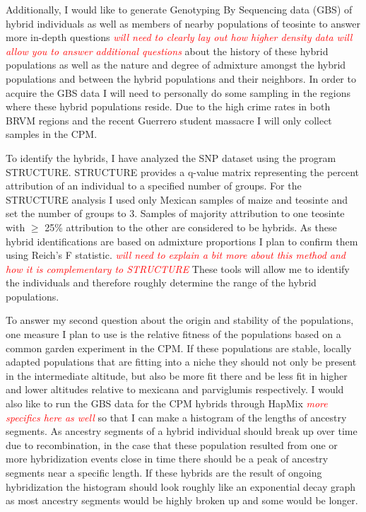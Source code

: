 \documentclass[12pt]{amsart}
\newcommand{\mbh}[1]{\textcolor{red}{ \emph{\scriptsize  #1}} }
\begin{document}
Additionally, I would like to generate Genotyping By Sequencing data (GBS) of hybrid individuals as well as members of nearby populations of teosinte to answer more in-depth questions \mbh{will need to clearly lay out how higher density data will allow you to answer additional questions} about the history of these hybrid populations as well as the nature and degree of admixture amongst the hybrid populations and between the hybrid populations and their neighbors.  
In order to acquire the GBS data I will need to personally do some sampling in the regions where these hybrid populations reside.  
Due to the high crime rates in both BRVM regions and the recent Guerrero student massacre I will only collect samples in the CPM.%

To identify the hybrids, I have analyzed the SNP dataset using the program STRUCTURE.  STRUCTURE provides a q-value matrix representing the percent attribution of an individual to a specified number of groups.  
For the STRUCTURE analysis I used only Mexican samples of maize and teosinte and set the number of groups to 3.
Samples of majority attribution to one teosinte with $\geq$ 25\% attribution to the other are considered to be hybrids.
As these hybrid identifications are based on admixture proportions I plan to confirm them using Reich's F statistic. \mbh{will need to explain a bit more about this method and how it is complementary to STRUCTURE}
These tools will allow me to identify the individuals and therefore roughly determine the range of the hybrid populations.

To answer my second question about the origin and stability of the populations, one measure I plan to use is the relative fitness of the populations based on a common garden experiment in the CPM. 
If these populations are stable, locally adapted populations that are fitting into a niche they should not only be present in the intermediate altitude, but also be more fit there and be less fit in higher and lower altitudes relative to mexicana and parviglumis respectively.
I would also like to run the GBS data for the CPM hybrids through HapMix \mbh{more specifics here as well} so that I can make a histogram of the lengths of ancestry segments.  
As ancestry segments of a hybrid individual should break up over time due to recombination, in the case that these population resulted from one or more hybridization events close in time there should be a peak of ancestry segments near a specific length.
If these hybrids are the result of ongoing hybridization the histogram should look roughly like an exponential decay graph as most ancestry segments would be highly broken up and some would be longer.%
\end{document}
